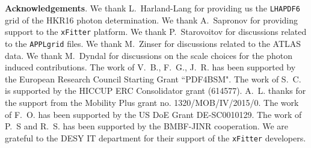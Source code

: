 {\bf Acknowledgements}.
%
We thank L.~Harland-Lang for providing us the {\tt LHAPDF6} grid of
the HKR16 photon determination.
%
We thank A.~Sapronov for providing support to the {\tt xFitter} platform.
%
%
We thank P.~Starovoitov for discussions related to the {\tt APPLgrid} files.
%
We thank M.~Zinser for discussions related to the ATLAS data.
% 
We thank M.~Dyndal for discussions on the scale choices for the photon induced contributions.
%
The work of V.~B., F.~G., J.~R. has been supported by the European
Research Council Starting Grant ``PDF4BSM".
%
The work of S.~C. is supported by the HICCUP ERC Consolidator grant (614577).
%
A.~L. thanks for the support from the Mobility Plus grant no. 1320/MOB/IV/2015/0.
%
The work of F.~O. has been supported by the US DoE Grant DE-SC0010129.
%
%
The work of P.~S and R.~S. has been supported by the BMBF-JINR cooperation.
%
We are grateful to the DESY IT department for their support of the {\tt xFitter} developers. 



